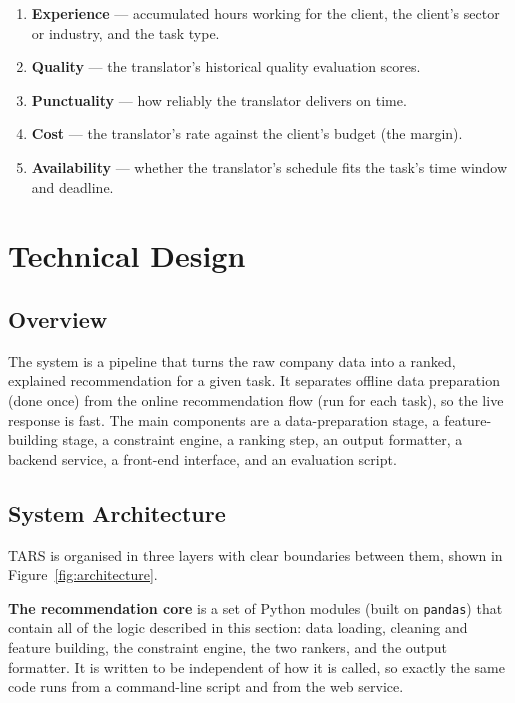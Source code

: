 \documentclass[9pt,a4paper,twoside]{utils/tau-class/tau}
\begin{document}
\begin{enumerate}
    \item \textbf{Experience} --- accumulated hours working for the client, the client's sector or industry, and the task type.
    \item \textbf{Quality} --- the translator's historical quality evaluation scores.
    \item \textbf{Punctuality} --- how reliably the translator delivers on time.
    \item \textbf{Cost} --- the translator's rate against the client's budget (the margin).
    \item \textbf{Availability} --- whether the translator's schedule fits the task's time window and deadline.
\end{enumerate}

\section{Technical Design}

\subsection{Overview}

The system is a pipeline that turns the raw company data into a ranked, explained recommendation for a given task. It separates offline data preparation (done once) from the online recommendation flow (run for each task), so the live response is fast. The main components are a data-preparation stage, a feature-building stage, a constraint engine, a ranking step, an output formatter, a backend service, a front-end interface, and an evaluation script.

\subsection{System Architecture}

TARS is organised in three layers with clear boundaries between them, shown in Figure~\ref{fig:architecture}.

\textbf{The recommendation core} is a set of Python modules (built on \texttt{pandas}) that contain all of the logic described in this section: data loading, cleaning and feature building, the constraint engine, the two rankers, and the output formatter. It is written to be independent of how it is called, so exactly the same code runs from a command-line script and from the web service.
\end{document}
